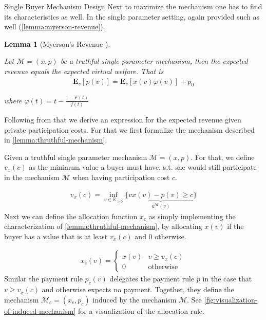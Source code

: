 \documentclass[11pt,a4paper]{article}
\newtheorem{lemma}[theorem]{Lemma}
\newcommand{\RR}{\ensuremath{\mathbb{R}}}
\newcommand{\1}[1]{\mbox{\rm\bf 1}_{#1}}
\begin{document}
\begin{section}{Single Buyer Mechanism Design}
 Next to maximize the mechanism one has to find its characteristics as well.
 In the single parameter setting, again \citet{myerson} provided such as well (\autoref{lemma:myerson-revenue}).

 \begin{lemma}[Myerson's Revenue \cite{myerson}]
     \label{lemma:myerson-revenue}

     Let $\mathcal{M}=(x,p)$ be a truthful single-parameter mechanism, then the expected revenue equals the expected virtual welfare. That is
     \begin{align*}
         \mathbf{E}_v\left[p(v)\right]
         = \mathbf{E}_v\left[x(v)\varphi(v)\right] + p_0
     \end{align*}

     where $\varphi(t) = t - \frac{1 - F(t)}{f(t)}$
 \end{lemma}

 Following from that we derive an expression for the expected revenue given private participation costs.
 For that we first formulize the mechanism described in \autoref{lemma:thruthful-mechanism}.

 Given a truthful single parameter mechanism $\mathcal{M}=(x,p)$.
 For that, we define $v_x(c)$ as the minimum value a buyer must have, s.t. she would still participate in the mechanism $\mathcal{M}$ when having participation cost $c$.

 \begin{align*}
     v_x(c) = \inf_{v \in \RR_{\geq 0}} \{\underbrace{vx(v) - p(v) \geq c}_{u^\mathcal{M}(v)}\}
 \end{align*}
 Next we can define the allocation function $x_c$ as simply implementing the characterization of \autoref{lemma:thruthful-mechanism},
 by allocating $x(v)$ if the buyer has a value that is at least $v_x(c)$ and $0$ otherwise.

 \begin{align*}
     x_c(v) = \begin{cases}
                  x(v) & v \geq v_x(c)    \\
                  0    & \text{otherwise}
              \end{cases}
 \end{align*}
 Similar the payment rule $p_c(v)$ delegates the payment rule $p$ in the case that $v \geq v_x(c)$ and otherwise expects no payment.
 Together, they define the mechanism $\mathcal{M}_c = (x_c, p_c)$ induced by the mechanism $\mathcal{M}$.
 See \autoref{fig:visualization-of-induced-mechanism} for a visualization of the allocation rule.


\end{section}
\end{document}
